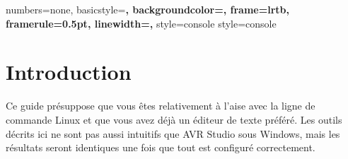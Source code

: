\newpage{}

\fancyfoot{}
\lhead{}
\cfoot{\thepage}        %
\rfoot{\today} %


\newcommand{\expr}[1]{\og \emph{{#1}} \fg} %
\newcommand{\important}[1]{\textbf{#1}}
\newcommand{\code}[1]{\texttt{#1}}

\newcommand{\urlrobopoly}{\url{http://robopoly.epfl.ch}}
\newcommand{\urldownloads}{\url{http://github.com/tunebird/robopoly-linux/downloads}}
\newcommand{\urlreadme}{
   \url{http://github.com/tunebird/robopoly-linux/blob/master/example/README.md}}
\newcommand{\urlgithub}{\url{http://github.com/tunebird/robopoly-linux}}




\tableofcontents{}

\newpage

\lstset{language=C}
{
  numbers=none,
  basicstyle=\bf\ttfamily,
  backgroundcolor=\color{grey92},
  frame=lrtb,
  framerule=0.5pt,
  linewidth=\textwidth,
}
{
  style=console
}
{
  style=console
}

\lstset{
  style=console
}



\section*{Introduction}
Ce guide présuppose que vous êtes relativement à l'aise avec la ligne de
commande Linux et que vous avez déjà un éditeur de texte préféré. Les outils
décrits ici ne sont pas aussi intuitifs que AVR Studio sous Windows, mais les
résultats seront identiques une fois que tout est configuré correctement.

